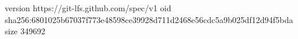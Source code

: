version https://git-lfs.github.com/spec/v1
oid sha256:6801025b67037f773e48598ce39928d711d2468e56cdc5a9b025df12d94f5bda
size 349692
